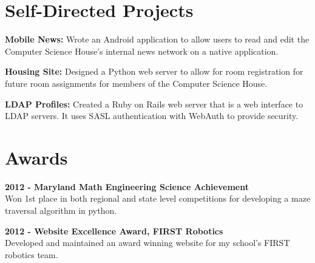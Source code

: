 \documentclass[10pt]{article} %
\begin{document}
{\begin{minipage}[t]{0.44\textwidth}

\section{Self-Directed Projects}
    \begin{sloppypar}
        {\bf Mobile News:} Wrote an Android application to allow users to read and edit 
        the Computer Science House's internal news network on a native application. \\
    \end{sloppypar} 
    \begin{sloppypar}
        {\bf Housing Site:} Designed a Python web server to allow for room registration for
        future room assignments for members of the Computer Science House.\\
    \end{sloppypar}
    \begin{sloppypar}
        {\bf LDAP Profiles:} Created a Ruby on Rails web server that is a web interface to LDAP
        servers. It uses SASL authentication with WebAuth to provide security. \\
    \end{sloppypar}
    

\section{Awards} 

\begin{sloppypar}
    {\bf 2012 - Maryland Math Engineering Science Achievement \\}
    Won 1st place in both regional and state level competitions for 
    developing a maze traversal algorithm in python.
\end{sloppypar}

\bigskip

\begin{sloppypar}
    {\bf 2012 - Website Excellence Award, FIRST Robotics \\}
    Developed and maintained an award winning website for my school's FIRST 
    robotics team.
\end{sloppypar}


\end{minipage}}
\end{document}
